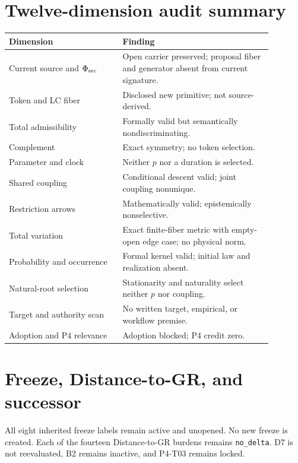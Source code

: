 \documentclass[11pt]{article}
\begin{document}
\section{Twelve-dimension audit summary}

\begin{center}
\small
\begin{tabular}{p{0.38\linewidth}p{0.50\linewidth}}
\toprule
Dimension & Finding \\
\midrule
Current source and $\Phi_{\rm src}$ & Open carrier preserved; proposal fiber and generator absent from current signature. \\
Token and LC fiber & Disclosed new primitive; not source-derived. \\
Total admissibility & Formally valid but semantically nondiscriminating. \\
Complement & Exact symmetry; no token selection. \\
Parameter and clock & Neither $p$ nor a duration is selected. \\
Shared coupling & Conditional descent valid; joint coupling nonunique. \\
Restriction arrows & Mathematically valid; epistemically nonselective. \\
Total variation & Exact finite-fiber metric with empty-open edge case; no physical norm. \\
Probability and occurrence & Formal kernel valid; initial law and realization absent. \\
Natural-root selection & Stationarity and naturality select neither $p$ nor coupling. \\
Target and authority scan & No written target, empirical, or workflow premise. \\
Adoption and P4 relevance & Adoption blocked; P4 credit zero. \\
\bottomrule
\end{tabular}
\end{center}

\section{Freeze, Distance-to-GR, and successor}

All eight inherited freeze labels remain active and unopened. No new freeze is
created. Each of the fourteen Distance-to-GR burdens remains
\texttt{no\_delta}. D7 is not reevaluated, B2 remains inactive, and P4-T03
remains locked.
\end{document}
